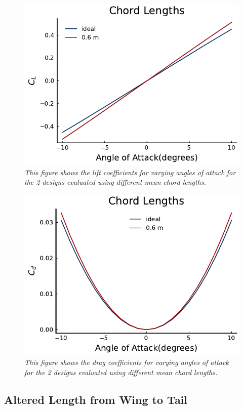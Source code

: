 \documentclass{journal}
\begin{document}
	\begin{figure}[H]
		\includegraphics{../graphics/chord_cl.pdf}
		\caption{\emph{This figure shows the lift coefficients for varying angles of attack for the 2 designs evaluated using different mean chord lengths.}}
		\label{fig:chord_cl}
	\end{figure}
	\begin{figure}[H]
		\includegraphics{../graphics/chord_cd.pdf}
		\caption{\emph{This figure shows the drag coefficients for varying angles of attack for the 2 designs evaluated using different mean chord lengths.}}
		\label{fig:chord_cd}
	\end{figure}
	
	\subsection{Altered Length from Wing to Tail}
	
\end{document}
